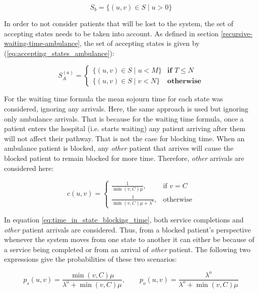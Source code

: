 \begin{equation*}
    S_b = \{(u,v) \in S \; | \; u > 0\}
\end{equation*}
 
In order to not consider patients that will be lost to the system, the set of accepting
states needs to be taken into account. As defined in section \ref{recursive-waiting-time-ambulance},
the set of accepting states is given by (\ref{eq:accepting_states_ambulance}):

\begin{equation*}
    S_A^{(a)}=
    \begin{cases}
        \{(u, v) \in S \; | \; u < M \} & \textbf{if } T \leq N\\
        \{(u, v) \in S \; | \; v < N \} & \textbf{otherwise}
    \end{cases}
\end{equation*}

For the waiting time formula the mean sojourn time for each state was considered,
ignoring any arrivals. Here, the same approach is used but ignoring only ambulance
arrivals. That is because for the waiting time formula, once a patient enters the
hospital (i.e. starts waiting) any patient arriving after them will not affect their
pathway. That is not the case for blocking time. When an ambulance patient is blocked,
any \textit{other} patient that arrives will cause the blocked patient to remain 
blocked for more time. Therefore, \textit{other} arrivals are considered here:

\begin{equation}\label{eq:time_in_state_blocking_time}
    c(u,v) = 
    \begin{cases}
        \frac{1}{\min(v,C) \mu}, & \text{if } v = C\\
        \frac{1}{\min(v,C) \mu + \lambda^o}, & \text{otherwise}
    \end{cases}
\end{equation}
 
In equation \ref{eq:time_in_state_blocking_time}, both service completions and 
\textit{other} patient arrivals are considered. 
Thus, from a blocked patient's perspective whenever the system moves from one state 
to another it can either be because of a service being completed or from an arrival 
of \textit{other} patient. 
The following two expressions give the probabilities of these two scenarios:

\begin{equation*}
    p_s(u,v) = \frac{\min(v,C)\mu}{\lambda^o + \min(v,C)\mu}, \qquad
    p_o(u,v) = \frac{\lambda^o}{\lambda^o + \min(v,C)\mu}
\end{equation*}


